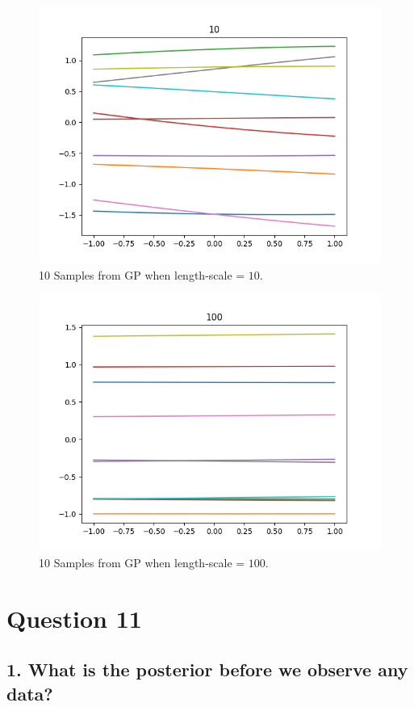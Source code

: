 \documentclass[12pt,letterpaper]{article}
\begin{document}
\clearpage

\begin{figure}[htb]
\centering
\includegraphics[scale =0.5]{Q10_10.png} 
\caption{10 Samples from GP when length-scale = $10$.}
\end{figure}
\begin{figure}[htb]
\centering
\includegraphics[scale =0.5]{Q10_100.png} 
\caption{10 Samples from GP when length-scale = $100$.}
\end{figure}

\section*{Question 11}
\subsection*{1. What is the posterior before we observe any data?}
\end{document}
